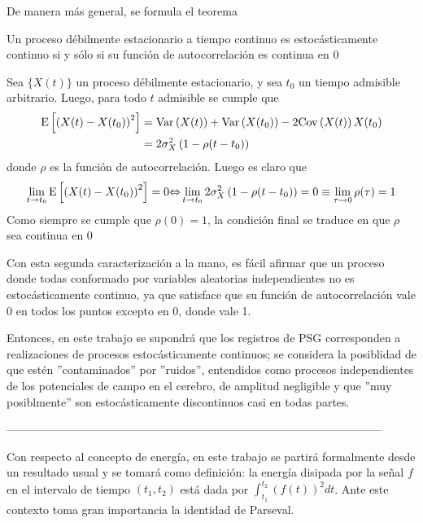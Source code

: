 De manera m\'as general, se formula el teorema

\begin{thrm}
Un proceso d\'ebilmente estacionario a tiempo continuo es estoc\'asticamente continuo si y s\'olo si
su funci\'on de autocorrelaci\'on es continua en 0
\end{thrm}
\begin{demostracion}
Sea $\{ X(t) \}$ un proceso d\'ebilmente estacionario, y sea $t_0$ un tiempo admisible arbitrario. 
Luego, para todo $t$ admisible se cumple que
\begin{align*}
\mathrm{E}\left[ \left( X(t) - X(t_0) \right)^{2} \right]
&= \mathrm{Var}\left( X(t) \right) + \mathrm{Var}\left( X(t_0) \right) - 2 \mathrm{Cov}\left( X(t) \right){X(t_0)}
\\
&= 2 \sigma_X^{2} \left( 1 - \rho(t-t_0) \right)
\end{align*}
donde $\rho$ es la funci\'on de autocorrelaci\'on. Luego es claro que
\begin{equation*}
\lim_{t\rightarrow t_0} \mathrm{E}\left[ \left( X(t) - X(t_0) \right)^{2} \right] = 0  
{\Leftrightarrow} 
\lim_{t\rightarrow t_0} 2 \sigma_X^{2} \left( 1 - \rho(t-t_0) \right) = 0
\equiv
\lim_{\tau \rightarrow 0} \rho(\tau) = 1
\end{equation*}
Como siempre se cumple que $\rho(0)=1$, la condici\'on final se traduce en que $\rho$ sea continua 
en 0
\end{demostracion}

Con esta segunda caracterizaci\'on a la mano, es f\'acil afirmar que un proceso donde todas
conformado por variables aleatorias independientes no es estoc\'asticamente continuo,
ya que satisface que su funci\'on de autocorrelaci\'on vale 0 en todos los puntos
excepto en 0, donde vale 1.

Entonces, en este trabajo se supondr\'a que los registros de PSG corresponden a realizaciones
de procesos estoc\'asticamente continuos; se considera la posiblidad de que est\'en
''contaminados'' por ''ruidos'', entendidos como procesos independientes de los potenciales de 
campo 
en el cerebro, de amplitud negligible y que ''muy posiblmente'' son estoc\'asticamente discontinuos 
casi en todas partes.

---------------------------------------------------------------------------------------------------

Con respecto al concepto de energ\'ia, en este trabajo se partir\'a formalmente desde un resultado
usual y se tomar\'a como definici\'on: la energ\'ia disipada por la se\~nal $f$ en el intervalo
de tiempo $(t_1,t_2)$ est\'a dada por $\int_{t_1}^{t_2} \left(f\left(t\right)\right)^{2} dt$.
Ante este contexto toma gran importancia la identidad de Parseval.

